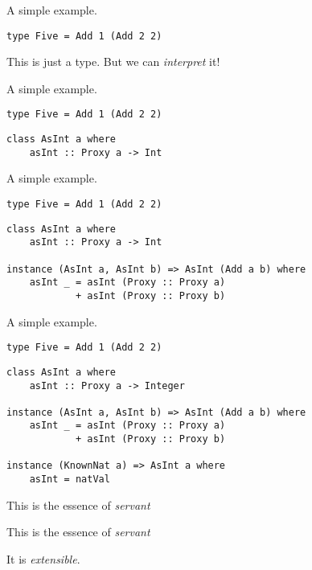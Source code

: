 \documentclass{beamer}
\begin{document}
\begin{frame}[fragile]
A simple example.
\begin{verbatim}
type Five = Add 1 (Add 2 2)
\end{verbatim}
This is just a type.
But we can \textit{interpret} it!
\end{frame}

\begin{frame}[fragile]
A simple example.
\begin{verbatim}
type Five = Add 1 (Add 2 2)
\end{verbatim}

\begin{verbatim}
class AsInt a where
    asInt :: Proxy a -> Int
\end{verbatim}
\end{frame}

\begin{frame}[fragile]
A simple example.
\begin{verbatim}
type Five = Add 1 (Add 2 2)
\end{verbatim}

\begin{verbatim}
class AsInt a where
    asInt :: Proxy a -> Int

instance (AsInt a, AsInt b) => AsInt (Add a b) where
    asInt _ = asInt (Proxy :: Proxy a)
            + asInt (Proxy :: Proxy b)
\end{verbatim}
\end{frame}

\begin{frame}[fragile]
A simple example.
\begin{verbatim}
type Five = Add 1 (Add 2 2)
\end{verbatim}

\begin{verbatim}
class AsInt a where
    asInt :: Proxy a -> Integer

instance (AsInt a, AsInt b) => AsInt (Add a b) where
    asInt _ = asInt (Proxy :: Proxy a)
            + asInt (Proxy :: Proxy b)

instance (KnownNat a) => AsInt a where
    asInt = natVal
\end{verbatim}
\end{frame}

\begin{frame}
This is the essence of \textit{servant}
\end{frame}

\begin{frame}
This is the essence of \textit{servant}

It is \textit{extensible}.
\end{frame}
\end{document}
